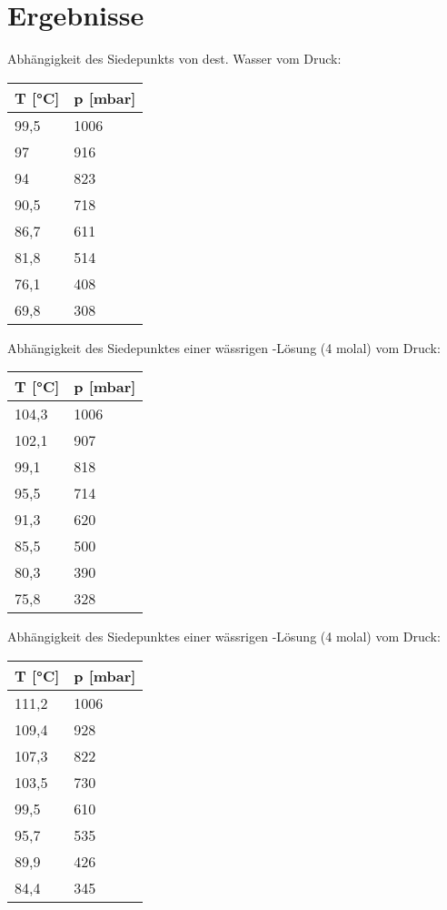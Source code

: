 
	\section*{Ergebnisse} 
		
		Abhängigkeit des Siedepunkts von dest. Wasser vom Druck:
		\begin{table}[H]
			\label{tab:Wasser}
				\begin{tabular}{|l|l|}
				\hline
				\textbf{T [°C]}	&	\textbf{p [mbar]} \\\hline
				99,5	&	1006 \\
				97		&	916 \\
				94		&	823 \\
				90,5	&	718 \\
				86,7 	&	611 \\
				81,8	&	514 \\
				76,1	&	408 \\
				69,8	&	308 \\\hline
				\end{tabular}
		\end{table} 
		
		Abhängigkeit des Siedepunktes einer wässrigen -Lösung (4 molal) vom Druck:
		\begin{table}[H]
			\label{tab:NaCl}
				\begin{tabular}{|l|l|}
				\hline
				\textbf{T [°C]}	&	\textbf{p [mbar]} \\\hline
				104,3	&	1006 \\
				102,1	&	907 \\
				99,1	&	818 \\
				95,5	&	714 \\
				91,3 	&	620 \\
				85,5	&	500 \\
				80,3	&	390 \\
				75,8	&	328 \\\hline
				\end{tabular}
		\end{table} 

		Abhängigkeit des Siedepunktes einer wässrigen -Lösung (4 molal) vom Druck:
		\begin{table}[H]
			\label{tab:CaCl2}
				\begin{tabular}{|l|l|}
				\hline
				\textbf{T [°C]}	&	\textbf{p [mbar]} \\\hline
				111,2	&	1006 \\
				109,4	&	928 \\
				107,3	&	822 \\
				103,5	&	730 \\
				99,5 	&	610 \\
				95,7	&	535 \\
				89,9	&	426 \\
				84,4	&	345 \\\hline
				\end{tabular}
		\end{table} 
